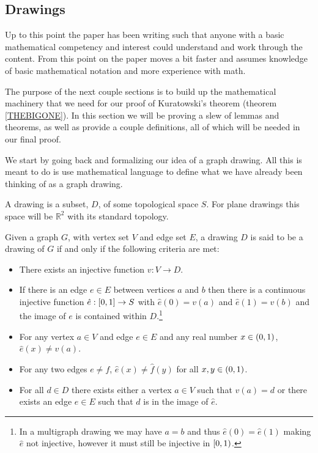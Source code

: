 \documentclass{article}
\begin{document}
\subsection{Drawings} \label{Draw}
Up to this point the paper has been writing such that anyone with a basic mathematical competency and interest could understand and work through the content. From this point on the paper moves a bit faster and assumes knowledge of basic mathematical notation and more experience with math.

The purpose of the next couple sections is to build up the mathematical machinery that we need for our proof of Kuratowski's theorem (theorem \ref{THEBIGONE}). In this section we will be proving a slew of lemmas and theorems, as well as provide a couple definitions, all of which will be needed in our final proof.

We start by going back and formalizing our idea of a graph drawing. All this is meant to do is use mathematical language to define what we have already been thinking of as a graph drawing.

\begin{definition}[Drawing]
	A drawing is a subset, $D$, of some topological space $S$. For plane drawings this space will be $\mathbb R^2$ with its standard topology.
\end{definition}

\begin{definition}
Given a graph $G$, with vertex set $V$ and edge set $E$, a drawing $D$ is said to be a drawing of $G$ if and only if the following criteria are met:
\begin{itemize}
	\item There exists an injective function $v:V\to D$.
	\item If there is an edge $e\in E$ between vertices $a$ and $b$ then there is a continuous injective function $\hat e:\left[ {0} , {1} \right]\to S$ with $\hat e(0) = v(a)$ and $\hat e(1) = v(b)$ and the image of $e$ is contained within $D$.\footnote{In a multigraph drawing we may have $a=b$ and thus $\hat e(0) = \hat e(1)$ making $\hat e$ not injective, however it must still be injective in $\left[ {0} , {1} \right)$.}
	\item For any vertex $a\in V$ and edge $e\in E$ and any real number $x\in\left( {0} , {1} \right)$, $\hat e(x)\not=v(a)$.
	\item For any two edges $e\not=f$, $\hat e(x) \not= \hat f(y)$ for all $x,y \in\left( {0} , {1} \right)$.
	\item For all $d\in D$ there exists either a vertex $a\in V$ such that $v(a) = d$ or there exists an edge $e\in E$ such that $d$ is in the image of $\hat e$.
\end{itemize}
\end{definition}
\end{document}
